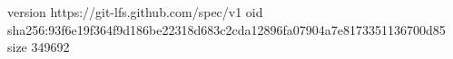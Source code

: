 version https://git-lfs.github.com/spec/v1
oid sha256:93f6e19f364f9d186be22318d683c2cda12896fa07904a7e8173351136700d85
size 349692
